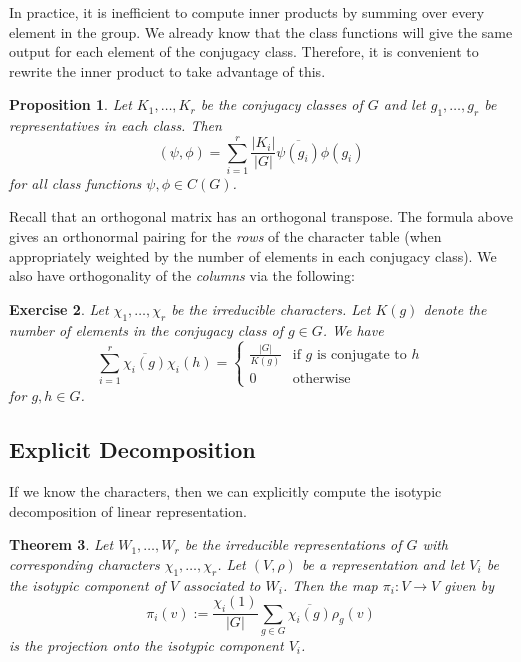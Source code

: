 \documentclass[12pt]{article}
\theoremstyle{plain}
\newtheorem{theorem}{Theorem}[section]
\newtheorem{proposition}[theorem]{Proposition}
\newtheorem{exercise}[theorem]{Exercise}
\theoremstyle{definition}
\theoremstyle{remark}
\numberwithin{equation}{section}
\begin{document}
In practice, it is inefficient to compute inner products by summing over
every element in the group.  We already know that the class functions
will give the same output for each element of the conjugacy class.
Therefore, it is convenient to rewrite the inner product to take
advantage of this.

\begin{proposition}
Let $K_1, \ldots, K_r$ be the conjugacy classes of $G$
and let $g_1,\ldots, g_r$ be representatives in each class.
Then
\[
( \psi, \phi ) = \sum_{i=1}^r \frac{|K_i|}{|G|}
\overline{\psi(g_i)}\phi(g_i)
\]
for all class functions $\psi,\phi \in C(G)$.
\end{proposition}

Recall that an orthogonal matrix has an orthogonal transpose.
The formula above gives an orthonormal pairing for the
\emph{rows} of the character table (when appropriately weighted by the number of elements in
each conjugacy class).  We also have orthogonality of the
\emph{columns} via the following:

\begin{exercise}
Let $\chi_1,\ldots,\chi_r$ be the irreducible characters.
Let $K(g)$ denote the number of elements in the conjugacy class of $g \in
G$.
We have
\[
\sum_{i=1}^r \overline{\chi_i(g)} \chi_i(h) =
\begin{cases}
\frac{|G|}{K(g)} & \textrm{if $g$ is conjugate to $h$}\\
0 & \textrm{otherwise}
\end{cases}
\]
for $g, h \in G$.
\end{exercise}

\subsection{Explicit Decomposition}

If we know the characters, then we can explicitly compute the isotypic
decomposition of linear representation. 

\begin{theorem}
Let $W_1,\ldots, W_r$ be the irreducible representations of $G$ with
corresponding characters $\chi_1,\ldots, \chi_r$.
Let $(V,\rho)$ be a representation and let $V_i$ be the isotypic
component of $V$ associated to $W_i$.
Then the map $\pi_i : V \to V$ given by
\[
\pi_i(v) := \frac{\chi_i(1)}{|G|} \sum_{g \in G} \overline{\chi_i(g)} \rho_g(v)
\]
is the projection onto the isotypic component $V_i$.
\end{theorem}
\end{document}
